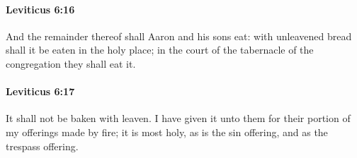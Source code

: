 		\paragraph{Leviticus 6:16} %
			\label{LEVITICUS-6-16}

			And the remainder thereof shall Aaron and his sons eat: with unleavened bread shall it be eaten in the holy place; in the court of the tabernacle of the congregation they shall eat it.


		\paragraph{Leviticus 6:17} %
			\label{LEVITICUS-6-17}

			It shall not be baken with leaven. I have given it unto them for their portion of my offerings made by fire; it is most holy, as is the sin offering, and as the trespass offering.

